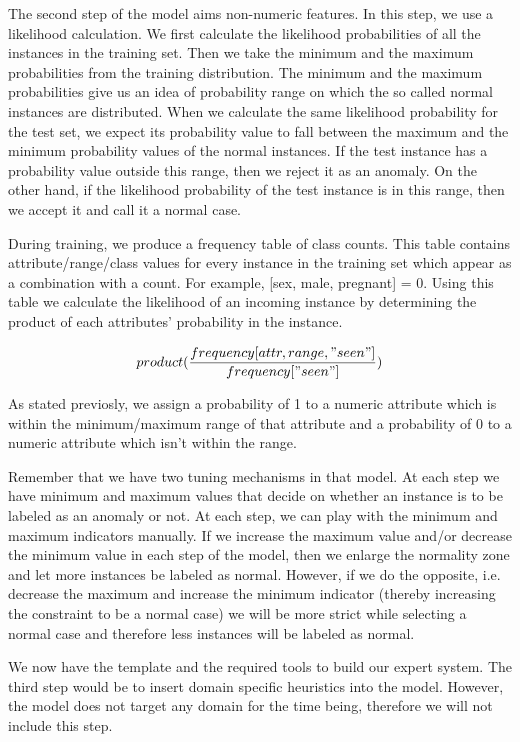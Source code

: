 \documentclass[conference]{IEEEtran}
\begin{document}
The second step of the model aims non-numeric features.
In this step, we use a likelihood calculation.
We first calculate the likelihood probabilities of all the instances in the training set.
Then we take the minimum and the maximum probabilities from the training distribution.
The minimum and the maximum probabilities give us an idea of probability range on which the so called normal instances are distributed.
When we calculate the same likelihood probability for the test set, we expect its probability value to fall between the maximum and the minimum probability values of the normal instances.
If the test instance has a probability value outside this range, then we reject it as an anomaly.
On the other hand, if the likelihood probability of the test instance is in this range, then we accept it and call it a normal case.

During training, we produce a frequency table of class counts.  This table contains attribute/range/class values for every instance in the training set which appear as a combination with a count.  For example, [sex, male, pregnant] = 0.  Using this table we calculate the likelihood of an incoming instance by determining the product of each attributes' probability in the instance.

\begin{equation}
product(\frac{frequency [attr, range, "seen"]}{frequency ["seen"]})
\end{equation}

As stated previosly, we assign a probability of 1 to a numeric attribute which is within the minimum/maximum range of that attribute and a probability of 0 to a numeric attribute which isn't within the range.

Remember that we have two tuning mechanisms in that model.
At each step we have minimum and maximum values that decide on whether an instance is to be labeled as an anomaly or not.
At each step, we can play with the minimum and maximum indicators manually.
If we increase the maximum value and/or decrease the minimum value in each step of the model, then we enlarge the normality zone and let more instances be labeled as normal.
However, if we do the opposite, i.e. decrease the maximum and increase the minimum indicator (thereby increasing the constraint to be a normal case) we will be more strict while selecting a normal case and therefore less instances will be labeled as normal.

We now have the template and the required tools to build our expert system.
The third step would be to insert domain specific heuristics into the model.
However, the model does not target any domain for the time being, therefore we will not include this step.
\end{document}
